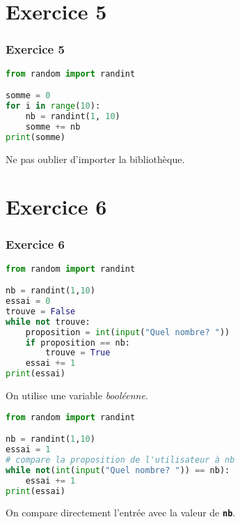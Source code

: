 \documentclass[svgnames,11pt]{beamer}
\begin{document}
\section{Exercice 5}
\begin{frame}[fragile]
    \frametitle{Exercice 5}

\begin{center}
\begin{lstlisting}[language=Python , basicstyle=\ttfamily\small, xleftmargin=1em, xrightmargin=1em]
from random import randint

somme = 0
for i in range(10):
    nb = randint(1, 10)
    somme += nb
print(somme)
\end{lstlisting}
\label{CODE}
\end{center}   
\begin{aretenir}[Remarque]
Ne pas oublier d'importer la bibliothèque.
\end{aretenir}
\end{frame}
\section{Exercice 6}
\begin{frame}[fragile]
    \frametitle{Exercice 6}

\begin{center}
\begin{lstlisting}[language=Python , basicstyle=\ttfamily\small, xleftmargin=1em, xrightmargin=1em]
from random import randint

nb = randint(1,10)
essai = 0
trouve = False
while not trouve:
    proposition = int(input("Quel nombre? "))
    if proposition == nb:
        trouve = True
    essai += 1
print(essai)
\end{lstlisting}
\label{CODE}
\end{center}   
\begin{aretenir}[Remarque]
On utilise une variable \emph{booléenne}. 
\end{aretenir}
\end{frame}
\begin{frame}[fragile]
\begin{center}
\begin{lstlisting}[language=Python , basicstyle=\ttfamily\small, xleftmargin=1em, xrightmargin=1em]
from random import randint

nb = randint(1,10)
essai = 1
# compare la proposition de l'utilisateur à nb
while not(int(input("Quel nombre? ")) == nb):
    essai += 1
print(essai)
\end{lstlisting}
\label{CODE}
\end{center}   
\begin{aretenir}[Remarque]
On compare directement l'entrée avec la valeur de \textbf{\texttt{nb}}.
\end{aretenir}
\end{frame}
\end{document}
